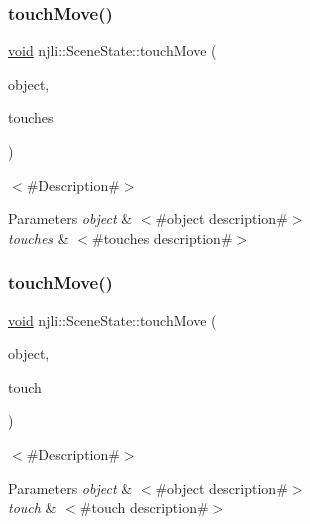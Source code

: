 \subsubsection{\texorpdfstring{touch\+Move()}{touchMove()}\hspace{0.1cm}{\footnotesize\ttfamily [1/2]}}
{\footnotesize\ttfamily \mbox{\hyperlink{_thread_8h_af1e856da2e658414cb2456cb6f7ebc66}{void}} njli\+::\+Scene\+State\+::touch\+Move (\begin{DoxyParamCaption}\item[{\mbox{\hyperlink{classnjli_1_1_scene}{Scene}} $\ast$}]{object,  }\item[{\mbox{\hyperlink{classnjli_1_1_device_touch}{Device\+Touch}} $\ast$$\ast$}]{touches }\end{DoxyParamCaption})}

$<$\#\+Description\#$>$


\begin{DoxyParams}{Parameters}
{\em object} & $<$\#object description\#$>$ \\
\hline
{\em touches} & $<$\#touches description\#$>$ \\
\hline
\end{DoxyParams}
\mbox{\label{classnjli_1_1_scene_state_ae76881dfc8ba5596113c1d35afec1b78}} 
\subsubsection{\texorpdfstring{touch\+Move()}{touchMove()}\hspace{0.1cm}{\footnotesize\ttfamily [2/2]}}
{\footnotesize\ttfamily \mbox{\hyperlink{_thread_8h_af1e856da2e658414cb2456cb6f7ebc66}{void}} njli\+::\+Scene\+State\+::touch\+Move (\begin{DoxyParamCaption}\item[{\mbox{\hyperlink{classnjli_1_1_scene}{Scene}} $\ast$}]{object,  }\item[{const \mbox{\hyperlink{classnjli_1_1_device_touch}{Device\+Touch}} \&}]{touch }\end{DoxyParamCaption})}

$<$\#\+Description\#$>$


\begin{DoxyParams}{Parameters}
{\em object} & $<$\#object description\#$>$ \\
\hline
{\em touch} & $<$\#touch description\#$>$ \\
\hline
\end{DoxyParams}
\mbox{\label{classnjli_1_1_scene_state_ade8105306ea69c75496a62a49ddb0352}} 
